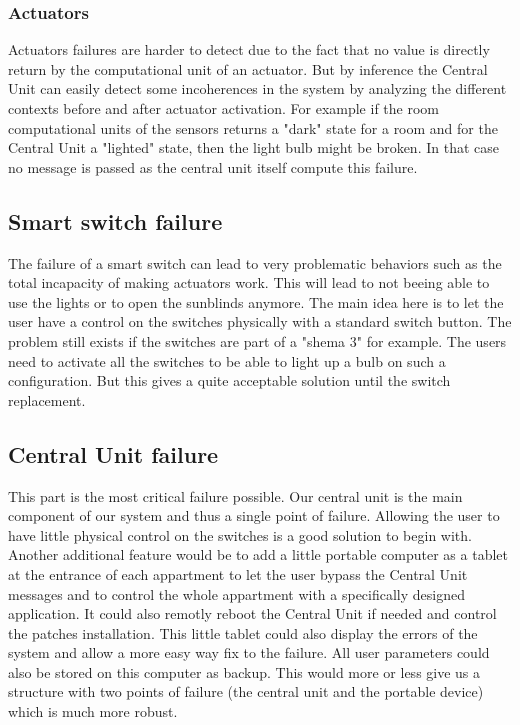 \documentclass{acm_proc_article-sp}
\begin{document}
\subsubsection{Actuators} 
Actuators failures are harder to detect due to the fact that no value is directly return by the computational unit of an actuator.
But by inference the Central Unit can easily detect some incoherences in the system by analyzing the different contexts before and after actuator activation.
For example if the room computational units of the sensors returns a "dark" state for a room and for the Central Unit a "lighted" state, then the light bulb might be broken.
In that case no message is passed as the central unit itself compute this failure.
\subsection{Smart switch failure}
The failure of a smart switch can lead to very problematic behaviors such as the total incapacity of making actuators work.
This will lead to not beeing able to use the lights or to open the sunblinds anymore.
The main idea here is to let the user have a control on the switches physically with a standard switch button.
The problem still exists if the switches are part of a "shema 3" for example. The users need to activate all the switches to be able to light up a bulb on such a configuration.
But this gives a quite acceptable solution until the switch replacement.

\subsection{Central Unit failure}
This part is the most critical failure possible.
Our central unit is the main component of our system and thus a single point of failure.
Allowing the user to have little physical control on the switches is a good solution to begin with.
Another additional feature would be to add a little portable computer as a tablet at the entrance of each appartment 
to let the user bypass the Central Unit messages and to control the whole appartment with a specifically designed application.
It could also remotly reboot the Central Unit if needed and control the patches installation.
This little tablet could also display the errors of the system and allow a more easy way fix to the failure.
All user parameters could also be stored on this computer as backup.
This would more or less give us a structure with two points of failure (the central unit and the portable device) which is much more robust.
\end{document}
